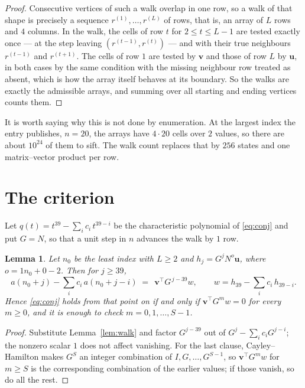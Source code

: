 \documentclass[11pt,a4paper]{article}
\theoremstyle{plain}
\newtheorem{lemma}[theorem]{Lemma}
\theoremstyle{definition}
\begin{document}
\begin{proof}
Consecutive vertices of such a walk overlap in one row, so a walk of that shape is
precisely a sequence $r^{(1)},\dots,r^{(L)}$ of rows, that is, an array of $L$ rows
and $4$ columns. In the walk, the cells of row $t$ for $2\le t\le L-1$ are tested
exactly once --- at the step leaving $(r^{(t-1)},r^{(t)})$ --- and with their true
neighbours $r^{(t-1)}$ and $r^{(t+1)}$. The cells of row $1$ are tested by
$\mathbf{v}$ and those of row $L$ by $\mathbf{u}$, in both cases by the same condition
with the missing neighbour row treated as absent, which is how the array itself behaves at
its boundary. So the walks are exactly the admissible arrays, and summing over all starting
and ending vertices counts them.
\end{proof}


It is worth saying why this is not done by enumeration. At the largest index the entry
publishes, $n=20$, the arrays have $4\cdot20$ cells over
$2$ values, so there are about $10^{24}$ of them to sift. The
walk count replaces that by $256$ states and one matrix--vector product per row.
\section{The criterion}

Let $q(t)=t^{39}-\sum_i c_i\,t^{39-i}$ be the characteristic polynomial of
\eqref{eq:conj} and put $G=N$, so that a unit step in $n$ advances the walk by
$1$ row.

\begin{lemma}\label{lem:crit}
Let $n_0$ be the least index with $L\ge2$ and $h_j=G^{j}N^{o}\mathbf{u}$, where
$o=1n_0+0-2$. Then for $j\ge39$,
\[
a(n_0+j)-\sum_i c_i\,a(n_0+j-i)\;=\;\,\mathbf{v}^{\!\top}G^{\,j-39}w,
\qquad w=h_{39}-\sum_i c_i\,h_{39-i} .
\]
Hence \eqref{eq:conj} holds from that point on if and only if
$\mathbf{v}^{\!\top}G^{m}w=0$ for every $m\ge0$, and it is enough to check
$m=0,1,\dots,S-1$.
\end{lemma}

\begin{proof}
Substitute Lemma~\ref{lem:walk} and factor $G^{j-39}$ out of
$G^{j}-\sum_ic_iG^{j-i}$; the nonzero scalar $1$ does not affect
vanishing. For the last clause, Cayley--Hamilton makes $G^{S}$ an integer combination of
$I,G,\dots,G^{S-1}$, so $\mathbf{v}^{\!\top}G^{m}w$ for $m\ge S$ is the corresponding
combination of the earlier values; if those vanish, so do all the rest.
\end{proof}
\end{document}

